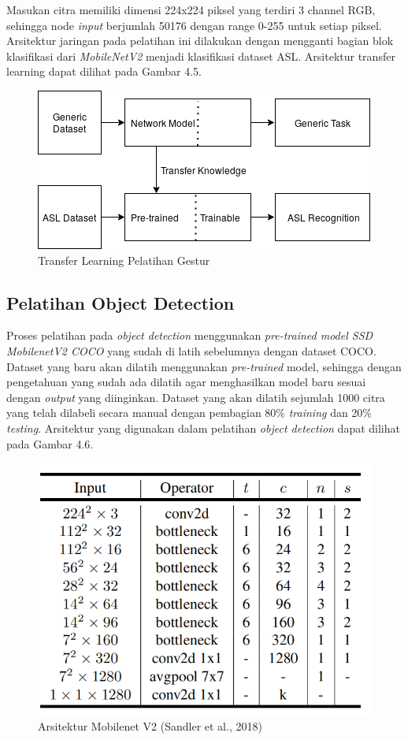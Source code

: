 Masukan citra memiliki dimensi 224x224 piksel yang terdiri 3 channel RGB, sehingga node \emph{input} berjumlah 50176 dengan range 0-255 untuk setiap piksel. Arsitektur jaringan pada pelatihan ini dilakukan dengan mengganti bagian blok klasifikasi dari \emph{MobileNetV2} menjadi klasifikasi dataset ASL. 
Arsitektur transfer learning dapat dilihat pada Gambar 4.5.
\begin{figure}[H]
	\centering
	\includegraphics[width=0.8\linewidth]{transfer}
	\caption{Transfer Learning Pelatihan Gestur}
	\label{fig:asritrkturku}
\end{figure}

\subsection{Pelatihan Object Detection}
Proses pelatihan pada \emph{object detection} menggunakan \emph{pre-trained model SSD MobilenetV2 COCO} yang sudah di latih sebelumnya dengan dataset COCO.
Dataset yang baru akan dilatih menggunakan \emph{pre-trained} model, sehingga dengan pengetahuan yang sudah ada dilatih agar menghasilkan model baru sesuai dengan \emph{output} yang diinginkan. 
Dataset yang akan dilatih sejumlah 1000 citra yang telah dilabeli secara manual dengan pembagian 80\% \emph{training} dan 20\% \emph{testing}.
Arsitektur yang digunakan dalam pelatihan \emph{object detection} dapat dilihat pada Gambar 4.6.
\begin{figure}[H]
	\centering
	\includegraphics[width=0.7\linewidth]{"v2"}
	\caption{Arsitektur Mobilenet V2 (Sandler et al., 2018)}
	\label{fig:v2}
\end{figure}
